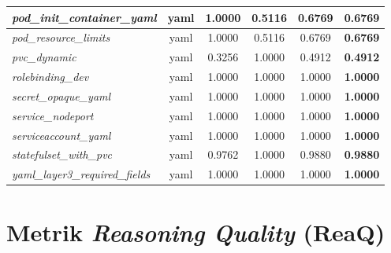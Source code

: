 \begin{footnotesize}
\begin{longtable}{|p{3.6cm}|c|c|c|c|c|}
\hline
\textit{pod\_\allowbreak{}init\_\allowbreak{}container\_\allowbreak{}yaml} & yaml & 1.0000 & 0.5116 & 0.6769 & \textbf{0.6769} \\
\hline
\textit{pod\_\allowbreak{}resource\_\allowbreak{}limits} & yaml & 1.0000 & 0.5116 & 0.6769 & \textbf{0.6769} \\
\hline
\textit{pvc\_\allowbreak{}dynamic} & yaml & 0.3256 & 1.0000 & 0.4912 & \textbf{0.4912} \\
\hline
\textit{rolebinding\_\allowbreak{}dev} & yaml & 1.0000 & 1.0000 & 1.0000 & \textbf{1.0000} \\
\hline
\textit{secret\_\allowbreak{}opaque\_\allowbreak{}yaml} & yaml & 1.0000 & 1.0000 & 1.0000 & \textbf{1.0000} \\
\hline
\textit{service\_\allowbreak{}nodeport} & yaml & 1.0000 & 1.0000 & 1.0000 & \textbf{1.0000} \\
\hline
\textit{serviceaccount\_\allowbreak{}yaml} & yaml & 1.0000 & 1.0000 & 1.0000 & \textbf{1.0000} \\
\hline
\textit{statefulset\_\allowbreak{}with\_\allowbreak{}pvc} & yaml & 0.9762 & 1.0000 & 0.9880 & \textbf{0.9880} \\
\hline
\textit{yaml\_\allowbreak{}layer3\_\allowbreak{}required\_\allowbreak{}fields} & yaml & 1.0000 & 1.0000 & 1.0000 & \textbf{1.0000} \\
\hline
\end{longtable}
\end{footnotesize}

\section{Metrik \textit{Reasoning Quality} (ReaQ)}

